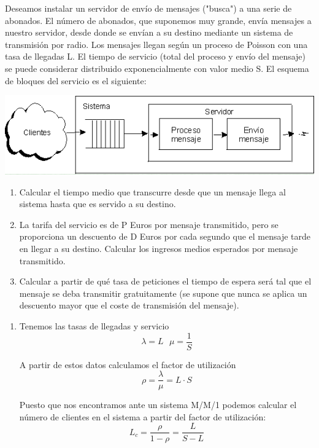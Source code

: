 \begin{problem}[7]\label{tema2:prob7}
Deseamos instalar un servidor de envío de mensajes ("busca") a una serie de abonados. El número de abonados, que suponemos muy grande, envía mensajes a nuestro servidor, desde donde se envían a su destino mediante un sistema de transmisión por radio. Los mensajes llegan según un proceso de Poisson con una tasa de llegadas L. El tiempo de servicio (total del proceso y envío del mensaje) se puede considerar distribuido exponencialmente con valor medio S. El esquema de bloques del servicio es el siguiente:

\begin{center}
  \includegraphics[keepaspectratio=true,width=\linewidth]{img/ej7.png}
\end{center}


\begin{enumerate}
\item Calcular el tiempo medio que transcurre desde que un mensaje llega al sistema hasta que es servido a su destino.
\item La tarifa del servicio es de P Euros por mensaje transmitido, pero se proporciona un descuento de D Euros por cada segundo que el mensaje tarde en llegar a su destino. Calcular los ingresos medios esperados por mensaje transmitido.
\item Calcular a partir de qué tasa de peticiones el tiempo de espera será tal que el mensaje se deba transmitir gratuitamente (se supone que nunca se aplica un descuento mayor que el coste de transmisión del mensaje).

\end{enumerate}

\newpage
\solution

\begin{enumerate}
\item
Tenemos las tasas de llegadas y servicio
\[λ=L \ \ \ μ=\frac{1}{S}\]

A partir de estos datos calculamos el factor de utilización
\[ρ = \frac{λ}{μ}=L\cdot S\]

Puesto que nos encontramos ante un sistema M/M/1 podemos calcular el número de clientes en el sistema a partir del factor de utilización:
\[L_c=\frac{ρ}{1-ρ}=\frac{L}{S-L}\]


\end{enumerate}
\end{problem}
